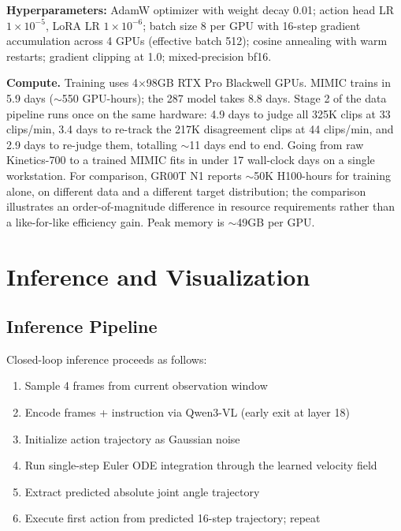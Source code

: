 \documentclass[letterpaper, 10pt, conference]{ieeeconf}
\begin{document}
\textbf{Hyperparameters:} AdamW optimizer with weight decay 0.01; action head LR $1\times10^{-5}$, LoRA LR $1\times10^{-6}$; batch size 8 per GPU with 16-step gradient accumulation across 4 GPUs (effective batch 512); cosine annealing with warm restarts; gradient clipping at 1.0; mixed-precision bf16.

\textbf{Compute.} Training uses 4$\times$98GB RTX Pro Blackwell GPUs. MIMIC trains in 5.9 days ($\sim$550 GPU-hours); the 287 model takes 8.8 days. Stage 2 of the data pipeline runs once on the same hardware: 4.9 days to judge all 325K clips at 33 clips/min, 3.4 days to re-track the 217K disagreement clips at 44 clips/min, and 2.9 days to re-judge them, totalling $\sim$11 days end to end. Going from raw Kinetics-700 to a trained MIMIC fits in under 17 wall-clock days on a single workstation. For comparison, GR00T N1 reports $\sim$50K H100-hours for training alone, on different data and a different target distribution; the comparison illustrates an order-of-magnitude difference in resource requirements rather than a like-for-like efficiency gain. Peak memory is $\sim$49GB per GPU.

\section{Inference and Visualization}

\subsection{Inference Pipeline}

Closed-loop inference proceeds as follows:

\begin{enumerate}
    \item Sample 4 frames from current observation window
    \item Encode frames + instruction via Qwen3-VL (early exit at layer 18)
    \item Initialize action trajectory as Gaussian noise
    \item Run single-step Euler ODE integration through the learned velocity field
    \item Extract predicted absolute joint angle trajectory
    \item Execute first action from predicted 16-step trajectory; repeat
\end{enumerate}
\end{document}

